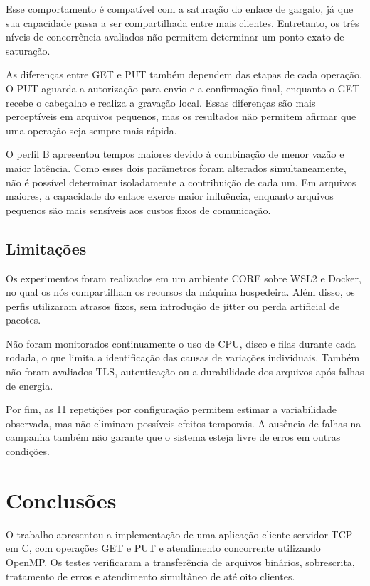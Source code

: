 \documentclass[12pt]{article}
\begin{document}
Esse comportamento é compatível com a saturação do enlace de gargalo, já que sua capacidade passa a ser compartilhada entre mais clientes. Entretanto, os três níveis de concorrência avaliados não permitem determinar um ponto exato de saturação.

As diferenças entre GET e PUT também dependem das etapas de cada operação. O PUT aguarda a autorização para envio e a confirmação final, enquanto o GET recebe o cabeçalho e realiza a gravação local. Essas diferenças são mais perceptíveis em arquivos pequenos, mas os resultados não permitem afirmar que uma operação seja sempre mais rápida.

O perfil B apresentou tempos maiores devido à combinação de menor vazão e maior latência. Como esses dois parâmetros foram alterados simultaneamente, não é possível determinar isoladamente a contribuição de cada um. Em arquivos maiores, a capacidade do enlace exerce maior influência, enquanto arquivos pequenos são mais sensíveis aos custos fixos de comunicação.

\subsection{Limitações}

Os experimentos foram realizados em um ambiente CORE sobre WSL2 e Docker, no qual os nós compartilham os recursos da máquina hospedeira. Além disso, os perfis utilizaram atrasos fixos, sem introdução de jitter ou perda artificial de pacotes.

Não foram monitorados continuamente o uso de CPU, disco e filas durante cada rodada, o que limita a identificação das causas de variações individuais. Também não foram avaliados TLS, autenticação ou a durabilidade dos arquivos após falhas de energia.

Por fim, as 11 repetições por configuração permitem estimar a variabilidade observada, mas não eliminam possíveis efeitos temporais. A ausência de falhas na campanha também não garante que o sistema esteja livre de erros em outras condições.



\section{Conclusões}
\label{sec:conclusoes}

O trabalho apresentou a implementação de uma aplicação cliente-servidor TCP em C, com operações GET e PUT e atendimento concorrente utilizando OpenMP. Os testes verificaram a transferência de arquivos binários, sobrescrita, tratamento de erros e atendimento simultâneo de até oito clientes.
\end{document}
